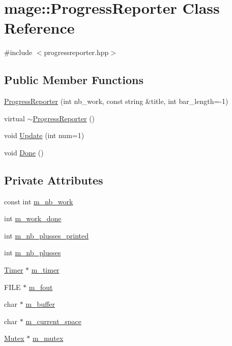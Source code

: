 \hypertarget{classmage_1_1_progress_reporter}{}\section{mage\+:\+:Progress\+Reporter Class Reference}
\label{classmage_1_1_progress_reporter}


{\ttfamily \#include $<$progressreporter.\+hpp$>$}

\subsection*{Public Member Functions}
\begin{DoxyCompactItemize}
\item 
\hyperlink{classmage_1_1_progress_reporter_a8820bc575fee3e8cbc217707d4931fc1}{Progress\+Reporter} (int nb\+\_\+work, const string \&title, int bar\+\_\+length=-\/1)
\item 
virtual \hyperlink{classmage_1_1_progress_reporter_aa543239c6dd4474a77cf4cf6904c1b26}{$\sim$\+Progress\+Reporter} ()
\item 
void \hyperlink{classmage_1_1_progress_reporter_ae865c4bb647c14dad318ea34f6933f1d}{Update} (int num=1)
\item 
void \hyperlink{classmage_1_1_progress_reporter_a11d758647ac2082bc296ab53a7454eaa}{Done} ()
\end{DoxyCompactItemize}
\subsection*{Private Attributes}
\begin{DoxyCompactItemize}
\item 
const int \hyperlink{classmage_1_1_progress_reporter_a8913c6a98282aaf1d4a5b1d0644a8824}{m\+\_\+nb\+\_\+work}
\item 
int \hyperlink{classmage_1_1_progress_reporter_a0b773635d4366e0603b8ea83abdd01b5}{m\+\_\+work\+\_\+done}
\item 
int \hyperlink{classmage_1_1_progress_reporter_a5aeccd74959514c3db9b36f6abe4cc70}{m\+\_\+nb\+\_\+plusses\+\_\+printed}
\item 
int \hyperlink{classmage_1_1_progress_reporter_abee761d058d9a3d6d56189b86e6daae6}{m\+\_\+nb\+\_\+plusses}
\item 
\hyperlink{classmage_1_1_timer}{Timer} $\ast$ \hyperlink{classmage_1_1_progress_reporter_aaca483b46968f0d39262305b5400a3e1}{m\+\_\+timer}
\item 
F\+I\+LE $\ast$ \hyperlink{classmage_1_1_progress_reporter_ad325ee5978fd1d16a97acbe37a977982}{m\+\_\+fout}
\item 
char $\ast$ \hyperlink{classmage_1_1_progress_reporter_a3aa49d5b886263402d9a9ecb4851670c}{m\+\_\+buffer}
\item 
char $\ast$ \hyperlink{classmage_1_1_progress_reporter_a93faeed07adf849e7351c85f06f2b4a7}{m\+\_\+current\+\_\+space}
\item 
\hyperlink{classmage_1_1_mutex}{Mutex} $\ast$ \hyperlink{classmage_1_1_progress_reporter_abda37942e51b682b2871e49883d58da1}{m\+\_\+mutex}
\end{DoxyCompactItemize}


